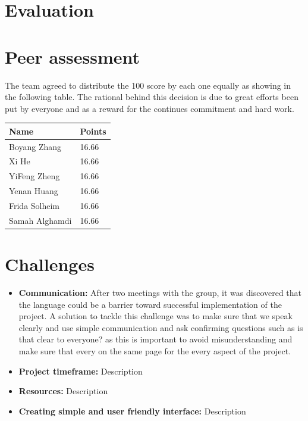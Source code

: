 \documentclass{article}
\begin{document}
\section{Evaluation}

\section{Peer assessment}
The team agreed to distribute the 100 score by each one equally as showing in the following table. The rational behind this decision is due to great efforts been put by everyone and as a reward for the continues commitment and hard work.


\begin{center}
\begin{tabular}{ | m{3cm}| m{1.3cm} | }
\hline
\textbf{Name} & \textbf{Points}  \\
\hline
Boyang Zhang & 16.66  \\
\hline
Xi He & 16.66  \\
\hline
YiFeng Zheng & 16.66 \\
\hline
Yenan Huang & 16.66 \\
\hline
Frida Solheim & 16.66 \\
\hline
Samah Alghamdi & 16.66 \\
\hline
\end{tabular}
\end{center}


\section{Challenges}
\begin{itemize}
\item \textbf{Communication:}
After two meetings with the group, it was discovered that the language could be a barrier toward successful implementation of the project. A solution to tackle this challenge was to make sure that we speak clearly and use simple communication and ask confirming questions such as is that clear to everyone? as this is important to avoid misunderstanding and make sure that every on the same page for the every aspect of the project.

\item \textbf{Project timeframe:}
Description

\item \textbf{Resources:}
Description
\item \textbf{Creating simple and user friendly interface:}
Description
\end{itemize}
\end{document}
